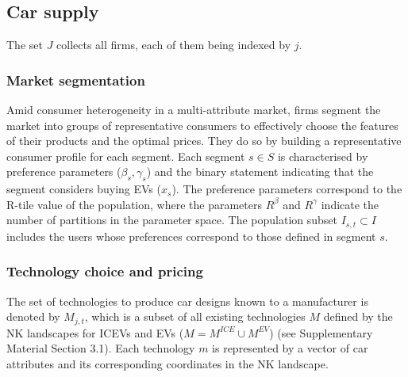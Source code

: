 \documentclass[12pt]{article}
\begin{document}
	\subsection{Car supply}
	The set $J$ collects all firms, each of them being indexed by $j$.

	\subsubsection{Market segmentation}\label{Supply:Segmentation}
	Amid consumer heterogeneity in a multi-attribute market, firms segment the market into groups of representative consumers to effectively choose the features of their products and the optimal prices. They do so by building a representative consumer profile for each segment. Each segment $s\in{S}$ is characterised by preference parameters ($\beta_s,\gamma_s$) and the binary statement indicating that the segment considers buying EVs ($x_s$). The preference parameters correspond to the R-tile value of the population, where the parameters $R^\beta$ and $R^\gamma$ indicate the number of partitions in the parameter space. The population subset $I_{s,t}\subset{I}$ includes the users whose preferences correspond to those defined in segment $s$.

	\subsubsection{Technology choice and pricing}\label{Supply:Choice_Pricing}
	The set of technologies to produce car designs known to a manufacturer is denoted by $M_{j,t}$, which is a subset of all existing technologies $M$ defined by the NK landscapes for ICEVs and EVs ($M=M^{ICE}\cup{M^{EV}}$) (see Supplementary Material Section 3.1). Each technology $m$ is represented by a vector of car attributes and its corresponding coordinates in the NK landscape.
\end{document}
